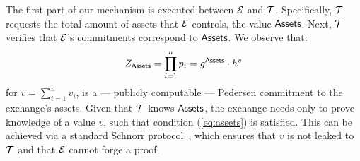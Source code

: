 The first part of our mechanism is executed between $\mathcal{E}$ and $\mathcal{T}$.
Specifically, $\mathcal{T}$ requests the total amount of assets that $\mathcal{E}$
controls, \ie the value $\mathsf{Assets}$. Next, $\mathcal{T}$ verifies that $\mathcal{E}$'s
commitments correspond to $\mathsf{Assets}$. We observe that:
\begin{align}
    Z_{\mathsf{Assets}} = \prod_{i = 1}^n p_i = g^{\mathsf{Assets}} \cdot h^v \label{eq:assets}
\end{align}
for $v = {\sum_{i = 1}^n v_i}$, is a --- publicly computable --- Pedersen
commitment to the exchange's assets. Given that $\mathcal{T}$ knows $\mathsf{Assets}$, the
exchange needs only to prove knowledge of a value $v$, such that condition
(\ref{eq:assets}) is satisfied. This can be achieved via a standard Schnorr
protocol~\cite{C:Schnorr89}, which ensures that $v$ is not leaked to $\mathcal{T}$
and that $\mathcal{E}$ cannot forge a proof.

%
%
%
%
%
%
%

